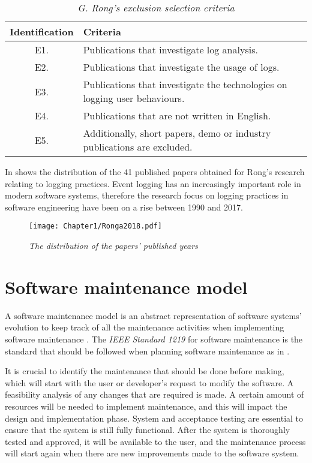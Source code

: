 \begin{table}[!htb]
	\centering
	\caption[G. Rong's exclusion selection criteria]
	{\textit{G. Rong's exclusion selection criteria \cite{Rong2018a}}}
	\label{tbl:CH1_RongExlSelectionCriteria}
	\begin{tabularx}{\textwidth}{|c|X|}
		\hline \textbf{Identification} & \textbf{Criteria} \\
		\hline E1. & Publications that investigate log analysis. \\
		\hline E2. & Publications that investigate the usage of logs. \\
		\hline E3. & Publications that investigate the technologies on logging user behaviours. \\
		\hline E4. & Publications that are not written in English. \\
		\hline E5. & Additionally, short papers, demo or industry publications are excluded. \\
		\hline
	\end{tabularx}
\end{table}

\clearpage

In  shows the distribution of the 41 published papers obtained for Rong's research relating to logging practices. Event logging has an increasingly important role in modern software systems, therefore the research focus on logging practices in software engineering have been on a rise between 1990 and 2017.

\begin{figure}[!htb] %
	\centering %
	\texttt{[image: Chapter1/Ronga2018.pdf]}
	\caption[The distribution of the papers’ published years]
	{\textit{The distribution of the papers’ published years \cite{Rong2018a}}} \label{fig:PushblisedPapers}
\end{figure} 

\chapter{Software maintenance model}
A software maintenance model is an abstract representation of software systems' evolution to keep track of all the maintenance activities when implementing software maintenance \cite{Ren2011}. The \textit{IEEE Standard 1219} for software maintenance is the standard that should be followed when planning software maintenance as in .\par It is crucial to identify the maintenance that should be done before making, which will start with the user or developer's request to modify the software. A feasibility analysis of any changes that are required is made. A certain amount of resources will be needed to implement maintenance, and this will impact the design and implementation phase. System and acceptance testing are essential to ensure that the system is still fully functional. After the system is thoroughly tested and approved, it will be available to the user, and the maintenance process will start again when there are new improvements made to the software system.

